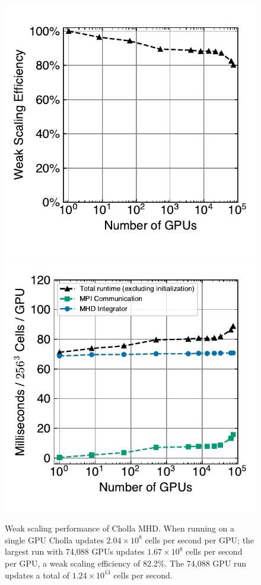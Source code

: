 \documentclass[modern]{aastex631}
\newcommand*{\img}[1]{%
    \raisebox{-.05\baselineskip}{%
        \texttt{[image: \#1]}%
    }%
}
\begin{document}
\begin{figure}[ht!]
    \includegraphics[width=0.5\linewidth]{scaling_tests_weak_efficiency.pdf}
    \includegraphics[width=0.5\linewidth]{scaling_tests_ms_per_gpu.pdf}
    \caption{Weak scaling performance of Cholla MHD. When running on a single GPU Cholla updates $2.04\times10^8$ cells per second per GPU; the largest run with 74,088 GPUs updates $1.67\times10^8$ cells per second per GPU, a weak scaling efficiency of 82.2\%. The 74,088 GPU run updates a total of $1.24\times10^{13}$ cells per second. \href{https://zenodo.org/records/10927223}{\img{zenodo-gradient-200.png}}}
    \label{fig:scaling-weak-efficiency}
\end{figure}
\end{document}
